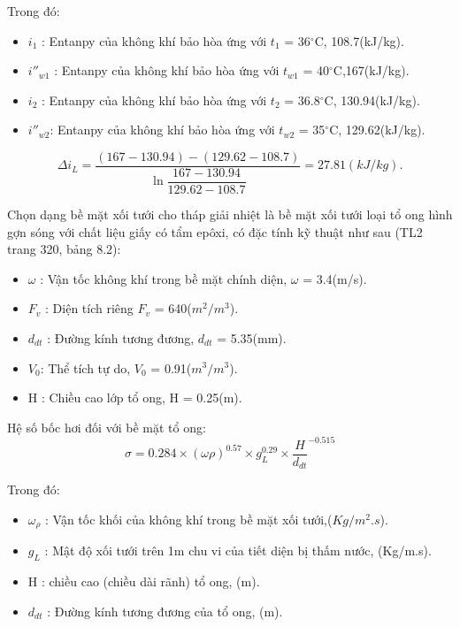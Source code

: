 Trong đó:
\begin{itemize}
	\item $i_{1}$ : Entanpy của không khí bảo hòa ứng với $t_{1}$ = 36$^{\circ}$C, 108.7(kJ/kg).
	\item $i''_{w1}$ : Entanpy của không khí bảo hòa ứng với $t_{w1}$ = 40$^{\circ}$C,167(kJ/kg).
	\item $i_{2}$ : Entanpy của không khí bảo hòa ứng với $t_{2}$ = 36.8$^{\circ}$C, 130.94(kJ/kg).
	\item $i''_{w2}$: Entanpy của không khí bảo hòa ứng với $t_{w2}$ = 35$^{\circ}$C, 129.62(kJ/kg).
\end{itemize}

\begin{equation*}
	\Delta i_{L} = \dfrac{(167-130.94)-(129.62-108.7)}{\ln \dfrac{167-130.94}{129.62-108.7}} = 27.81(kJ/kg).
\end{equation*}

Chọn dạng bề mặt xối tưới cho tháp giải nhiệt là bề mặt xối tưới loại tổ ong hình gợn sóng với chất liệu giấy có tẩm epôxi, có đặc tính kỹ thuật như sau (TL2 trang 320, bảng 8.2):
\begin{itemize}
	\item $\omega$ : Vận tốc không khí trong bề mặt chính diện, $\omega$ = 3.4(m/s).
	\item $F_{v}$ : Diện tích riêng $F_{v}$ = 640($m^2/m^3$).
	\item $d_{dt}$ : Đường kính tương đương, $d_{dt}$ = 5.35(mm).
	\item $V_{0}$: Thể tích tự do, $V_{0}$ = 0.91($m^3/m^3$).
	\item H : Chiều cao lớp tổ ong, H = 0.25(m).
\end{itemize}

Hệ số bốc hơi đối với bề mặt tổ ong:
\begin{equation*}
	\sigma = 0.284 \times (\omega \rho)^{0.57} \times g_{L}^{0.29} \times \dfrac{H}{d_{dt}}^{-0.515}
\end{equation*}

Trong đó:
\begin{itemize}
	\item $\omega_{\rho}$ : Vận tốc khối của không khí trong bề mặt xối tưới,($Kg/m^2.s$).
	\item $g_{L}$ : Mật độ xối tưới trên 1m chu vi của tiết diện bị thấm nước, (Kg/m.s).
	\item H : chiều cao (chiều dài rãnh) tổ ong, (m).
	\item $d_{dt}$ : Đường kính tương đương của tổ ong, (m).
\end{itemize}


